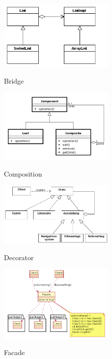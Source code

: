 \begin{figure}[h]
	\begin{center}
		\includegraphics[width=0.5\textwidth]{images/bridge}
		\label{fig:bridge}
		\caption{Bridge}
	\end{center}
\end{figure}

\begin{figure}[h]
	\begin{center}
		\includegraphics[width=0.5\textwidth]{images/composite}
		\label{fig:composite}
		\caption{Composition}
	\end{center}
\end{figure}

\begin{figure}[h]
	\begin{center}
		\includegraphics[width=0.5\textwidth]{images/decorator}
		\label{fig:decorator}
		\caption{Decorator}
	\end{center}
\end{figure}

\begin{figure}[h]
	\begin{center}
		\includegraphics[width=0.5\textwidth]{images/facade}
		\label{fig:facade}
		\caption{Facade}
	\end{center}
\end{figure}

